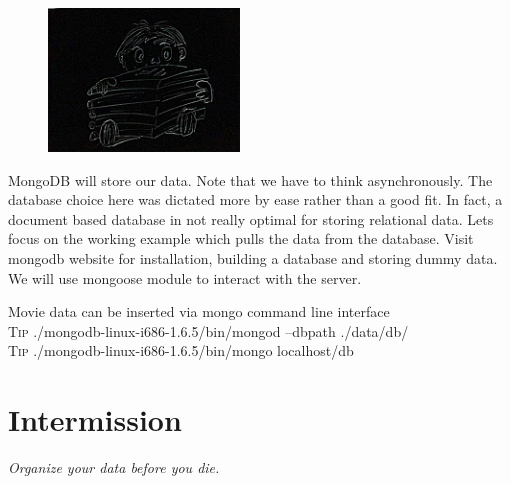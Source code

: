\documentclass[12pt]{book}
\begin{document}
\begin{figure}
\begin{center}\includegraphics[width=2in]{org/art/dataStorage.png}\end{center}
\end{figure}

MongoDB will store our data. Note that we have to think asynchronously. The database choice here was dictated more by ease rather than a good fit. In fact, a document based database in not really optimal for storing relational data.
Lets focus on the working example which pulls the data from the database. Visit mongodb website for installation, building a database and storing dummy data. We will use mongoose module to interact with the server.

\vspace{0.6cm}\vspace{0.6cm}

Movie data can be inserted via mongo command line interface \\
\colorbox{tipcolour}{\tiny \textsc{Tip} \small ./mongodb-linux-i686-1.6.5/bin/mongod --dbpath ./data/db/ } \\
\colorbox{tipcolour}{\tiny \textsc{Tip} \small ./mongodb-linux-i686-1.6.5/bin/mongo localhost/db } \\
\par





\chapter{Intermission}
\begin{flushright}\textit{Organize your data before you die.}\end{flushright}
\end{document}
